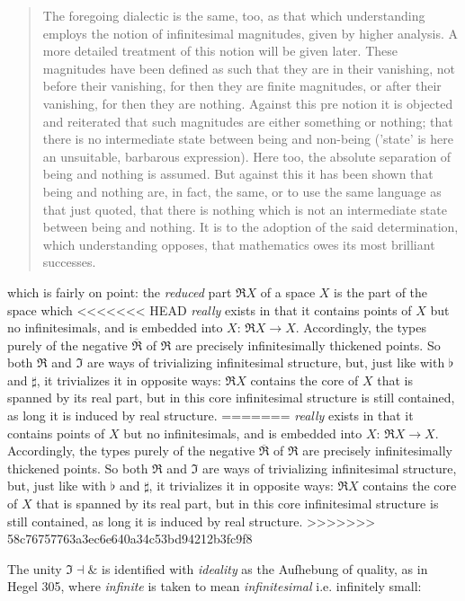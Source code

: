 \documentclass{article}
\begin{document}
\begin{quote}
    The foregoing dialectic is the same, too, as that which understanding employs the notion of infinitesimal
magnitudes, given by higher analysis. A more detailed treatment of this notion will be given later. These
magnitudes have been defined as such that they are in their vanishing, not before their vanishing, for
then they are finite magnitudes, or after their vanishing, for then they are nothing. Against this pre
notion it is objected and reiterated that such magnitudes are either something or nothing; that there
is no intermediate state between being and non-being ('state' is here an unsuitable, barbarous expression).
Here too, the absolute separation of being and nothing is assumed. But against this it has been shown
that being and nothing are, in fact, the same, or to use the same language as that just quoted, that there
is nothing which is not an intermediate state between being and nothing. It is to the adoption of the
said determination, which understanding opposes, that mathematics owes its most brilliant successes.
\end{quote}    

which is fairly on point: the \emph{reduced} part $\Re X$ of a space $X$ is the part of the space which
<<<<<<< HEAD
\emph{really} exists in that it contains points of $X$ but no infinitesimals, and is embedded into $X$: $\Re
X\rightarrow X$. Accordingly, the types purely of the negative $\overline{\Re}$ of $\Re$ are precisely
infinitesimally thickened points. So both $\Re$ and $\Im$ are ways of trivializing infinitesimal structure,
but, just like with $\flat$ and  $\sharp$, it trivializes it in opposite ways: $\Re X$ contains the core of
$X$ that is spanned by its real part, but in this core infinitesimal structure is still contained, as long it
is induced by real structure. 
=======
\emph{really} exists in that it contains points of $X$ but no infinitesimals, and is embedded into $X$:
$\Re X\rightarrow X$. Accordingly, the types purely of the negative $\overline{\Re}$ of $\Re$ are precisely
infinitesimally thickened points. So both $\Re$ and $\Im$ are ways of trivializing infinitesimal structure,
but, just like with $\flat$ and  $\sharp$, it trivializes it in opposite ways: $\Re X$ contains the core
of $X$ that is spanned by its real part, but in this core infinitesimal structure is still contained,
as long it is induced by real structure. 
>>>>>>> 58c76757763a3ec6e640a34c53bd94212b3fc9f8

The unity $\Im\dashv\&$ is identified with \emph{ideality} as the Aufhebung of quality, as in Hegel 305,
where \emph{infinite} is taken to mean \emph{infinitesimal} i.e. infinitely small:
\end{document}

